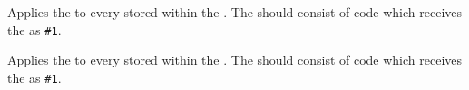 \documentclass[oneside]{book}
\begin{document}
\begin{function}{\TlMapInline}
\begin{syntax}
  
\end{syntax}
Applies the  to every  stored within the
. The   should consist of code which
receives the  as \verb|#1|.
\begin{demohigh}
\IgnoreSpacesOn
\TlClear \lTmpaTl
{} {
  \TlPutRight \lTmpaTl {[#1]}
}
\TlUse \lTmpaTl
\IgnoreSpacesOff
\end{demohigh}
\end{function}

\begin{function}{\TlVarMapInline}
\begin{syntax}
  
\end{syntax}
Applies the  to every  stored within the
. The  should consist of code which
receives the  as \verb|#1|.
\begin{demohigh}
\IgnoreSpacesOn
\TlClear \lTmpaTl
\TlSet {}
\TlVarMapInline \lTmpkTl {
  \TlPutRight \lTmpaTl {[#1]}
}
\TlUse \lTmpaTl
\IgnoreSpacesOff
\end{demohigh}
\end{function}

\end{document}
